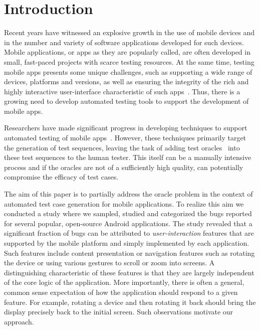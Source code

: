 \section{Introduction}
\label{introduction}

Recent years have witnessed an explosive growth in the use of mobile devices and in the number and variety of software applications developed for such devices. Mobile applications, or apps as they are popularly called, are often developed in small, fast-paced projects with scarce testing resources. At the same time, testing mobile apps presents some unique challenges, such as supporting a wide range of devices, platforms and versions, as well as ensuring the integrity of the rich and highly interactive user-interface characteristic of such apps~\cite{MobileDev:IBMWhitePaper}. Thus, there is a growing need to develop automated testing tools to support the development of mobile apps.

Researchers have made significant progress in developing techniques to support automated testing of mobile apps~\cite{Nguyen:2012:ISSTA, AnandFSE2012, AmalfitanoASE2012, Joorabchi:2012:WCRE, collider2013}. However, these techniques primarily target the generation of test sequences, leaving the task of adding test oracles~\cite{Oracle:Howden78, Weyuker80} into these test sequences to the human tester. This itself can be a manually intensive process and if the oracles are not of a sufficiently high quality, can potentially compromise the efficacy of test cases.

The aim of this paper is to partially address the oracle problem in the context of automated test case generation for mobile applications. To realize this aim we conducted a study where we sampled, studied and categorized the bugs reported for several popular, open-source Android applications. The study revealed that a significant fraction of bugs can be attributed to \emph{user-interaction} features that are supported by the mobile platform and simply implemented by each application. Such features include content presentation or navigation features such as rotating the device or using various gestures to scroll or zoom into screens. A distinguishing characteristic of these features is that they are largely independent of the core logic of the application. More importantly, there is often a general, common sense expectation of how the application should respond to a given feature. For example, rotating a device and then rotating it back should bring the display precisely back to the initial screen. Such observations motivate our approach.

